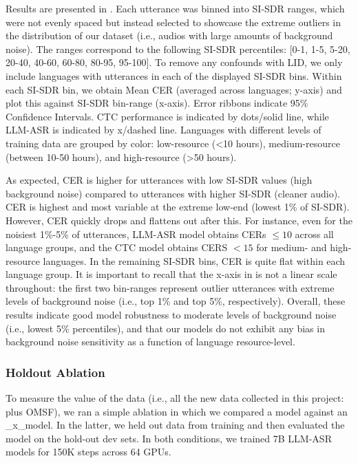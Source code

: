 Results are presented in . Each utterance was binned into SI-SDR ranges, which were not evenly spaced but instead selected to showcase the extreme outliers in the distribution of our \allasr{} dataset (i.e., audios with large amounts of background noise). The ranges correspond to the following SI-SDR percentiles: [0-1, 1-5, 5-20, 20-40, 40-60, 60-80, 80-95, 95-100].  To remove any confounds with LID, we only include languages with utterances in each of the displayed SI-SDR bins. Within each SI-SDR bin, we obtain Mean CER (averaged across languages; y-axis) and plot this against SI-SDR bin-range (x-axis). Error ribbons indicate 95\% Confidence Intervals. CTC performance is indicated by dots/solid line, while LLM-ASR is indicated by x/dashed line. Languages with different levels of training data are grouped by color: low-resource (<10 hours), medium-resource (between 10-50 hours), and high-resource (>50 hours). 

As expected, CER is higher for utterances with low SI-SDR values (high background noise) compared to utterances with higher SI-SDR (cleaner audio). CER is highest and most variable at the extreme low-end (lowest 1\% of SI-SDR).  However, CER quickly drops and flattens out after this. For instance, even for the noisiest 1\%-5\% of utterances, LLM-ASR model obtains CERs $\leq 10$ across all language groups, and the CTC model obtains CERS $<15$ for medium- and high-resource languages. In the remaining SI-SDR bins, CER is quite flat within each language group. It is important to recall that the x-axis in  is not a linear scale throughout: the first two bin-ranges represent outlier utterances with extreme levels of background noise (i.e., top 1\% and top 5\%, respectively). Overall, these results indicate good model robustness to moderate levels of background noise (i.e., lowest 5\% percentiles), and that our models do not exhibit any bias in background noise sensitivity as a function of language resource-level.

\subsubsection{\vendoromsf Holdout Ablation}
\label{sec:omni_asr_corpus_holdout}

To measure the value of the \vendoromsf data (i.e., all the new data collected in this project: \vendorcorpus plus OMSF), we ran a simple ablation in which we compared a \allasr{} model against an \allasr{}\_x\_\vendoromsf model.  In the latter, we held out \vendoromsf data from training and then evaluated the model on the hold-out \vendoromsf dev sets. In both conditions, we trained 7B LLM-ASR models for 150K steps across 64 GPUs.

